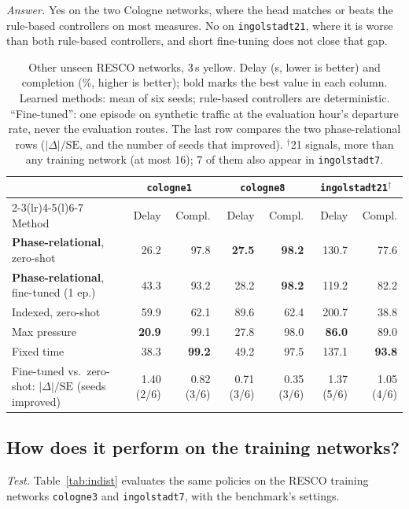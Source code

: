 \documentclass[conference]{IEEEtran}
\begin{document}
\emph{Answer.} Yes on the two Cologne networks, where the head matches or beats the
rule-based controllers on most measures. No on \texttt{ingolstadt21}, where it is worse
than both rule-based controllers, and short fine-tuning does not close that gap.

\begin{table}[t]
\caption{Other unseen RESCO networks, $3$\,s yellow. Delay (s, lower is better) and
completion (\%, higher is better); bold marks the best value in each column. Learned
methods: mean of six seeds; rule-based controllers are deterministic. ``Fine-tuned'': one
episode on synthetic traffic at the evaluation hour's departure rate, never the evaluation
routes. The last row compares the two phase-relational rows ($|\Delta|/\mathrm{SE}$, and
the number of seeds that improved). $^\dagger$21 signals, more than any training network
(at most 16); 7 of them also appear in \texttt{ingolstadt7}.}
\label{tab:unseen}
\centering\footnotesize
\begin{tabular}{@{}lrrrrrr@{}}
\toprule
 & \multicolumn{2}{c}{\texttt{cologne1}} & \multicolumn{2}{c}{\texttt{cologne8}} & \multicolumn{2}{c}{\texttt{ingolstadt21}$^\dagger$} \\
\cmidrule(lr){2-3}\cmidrule(lr){4-5}\cmidrule(l){6-7}
Method & Delay & Compl. & Delay & Compl. & Delay & Compl. \\
\midrule
\textbf{Phase-relational}, zero-shot & 26.2 & 97.8 & \textbf{27.5} & \textbf{98.2} & 130.7 & 77.6 \\
\textbf{Phase-relational}, fine-tuned (1 ep.) & 43.3 & 93.2 & 28.2 & \textbf{98.2} & 119.2 & 82.2 \\
Indexed, zero-shot & 59.9 & 62.1 & 89.6 & 62.4 & 200.7 & 38.8 \\
Max pressure & \textbf{20.9} & 99.1 & 27.8 & 98.0 & \textbf{86.0} & 89.0 \\
Fixed time & 38.3 & \textbf{99.2} & 49.2 & 97.5 & 137.1 & \textbf{93.8} \\
\midrule
Fine-tuned vs.\ zero-shot: $|\Delta|/\mathrm{SE}$ (seeds improved) & 1.40 (2/6) & 0.82 (3/6) & 0.71 (3/6) & 0.35 (3/6) & 1.37 (5/6) & 1.05 (4/6) \\
\bottomrule
\end{tabular}
\end{table}

\subsection{How does it perform on the training networks?}\label{sec:indist}
\emph{Test.} Table~\ref{tab:indist} evaluates the same policies on the RESCO training
networks \texttt{cologne3} and \texttt{ingolstadt7}, with the benchmark's settings.
\end{document}
